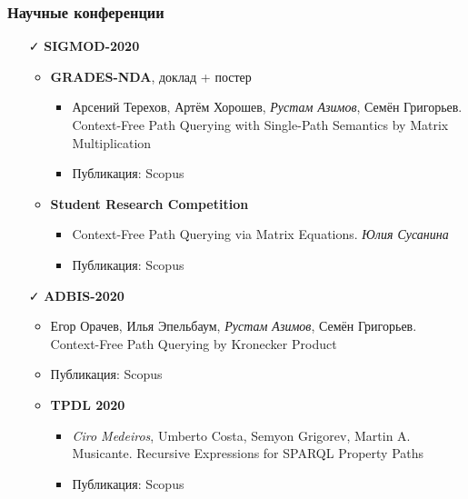 \documentclass[xcolor=table]{beamer}
\begin{document}
\begin{frame}[fragile]
\frametitle{Научные конференции}
\begin{itemize}

      \item[\faCheck] \textbf{SIGMOD-2020} 
      \begin{itemize}
        \item \textbf{GRADES-NDA}, доклад + постер
        \begin{itemize} 
            \item Арсений Терехов, Артём Хорошев, \emph{Рустам Азимов}, Семён Григорьев. Context-Free Path Querying with Single-Path Semantics by Matrix Multiplication
            \item Публикация: Scopus
        \end{itemize}
        \item \textbf{Student Research Competition}
        \begin{itemize}
          \item Context-Free Path Querying via Matrix Equations. \emph{Юлия Сусанина}
          \item Публикация: Scopus
        \end{itemize}
      \end{itemize}

      
      \item[\faCheck] \textbf{ADBIS-2020}
      \begin{itemize}
         \item Егор Орачев, Илья Эпельбаум, \emph{Рустам Азимов}, Семён Григорьев. Context-Free Path Querying by Kronecker Product
         \item Публикация: Scopus

         \vspace{1em}

         \item \textbf{TPDL 2020}
         \begin{itemize}
          \item \emph{Ciro Medeiros}, Umberto Costa, Semyon Grigorev, Martin A. Musicante. Recursive Expressions for SPARQL Property Paths
          \item Публикация: Scopus
         \end{itemize}
      \end{itemize}

    \end{itemize}
    \end{frame}
\end{document}
